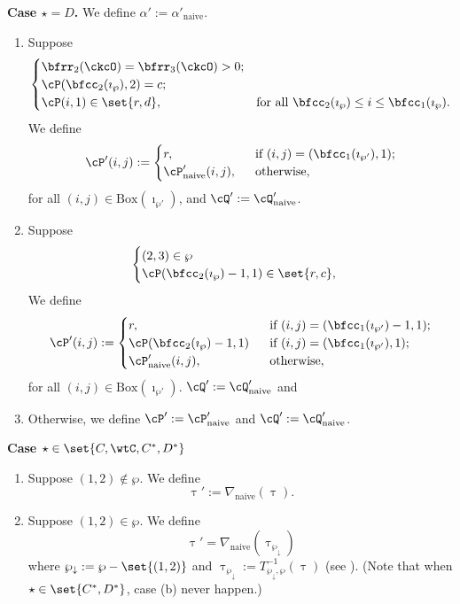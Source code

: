 \documentclass[12pt,a4paper]{amsart}
\numberwithin{equation}{section}
\theoremstyle{remark}
\def\BOX#1{\mathrm{Box}(#1)}
\def\AND{\quad \text{and} \quad}
\def\wpm{\wp_{\downarrow}}
\def\tnaive{\mathrm{naive}}
\def\imathwpp{\imath_{\wp'}}
\def\cPpn{\cP'_\mathrm{naive}}
\def\cQpn{\cQ'_\mathrm{naive}}
\def\alphapn{\alpha'_{\tnaive}}
\def\DDn{\nabla_{\tnaive}}
\begin{document}
{\bfseries Case $\star = D$. }
We define $\alpha' := \alphapn$.
\begin{enumerate}[label=(\alph*)]
  \item  Suppose
  \[
    \begin{cases}
      \bfrr_2(\ckcO)=\bfrr_{3}(\ckcO)>0; & \\
      \cP(\bfcc_{2}(\imath_{\wp}),2) = c;  &\\
      \cP(i,1)\in \set{r,d}, & \text{for all
        $\bfcc_{2}(\imath_{\wp})\leq i\leq \bfcc_{1}(\imath_{\wp})$}.
    \end{cases}
  \]
  We define %
  \[
    \cP'(i,j) := \begin{cases}
      r, & \ \text{ if $(i,j) = (\bfcc_1(\imathwpp),1)$;}\\
      \cPpn(i,j), & \ \text{ otherwise},
    \end{cases}
  \] for all $(i,j)\in \BOX{\imathwpp}$, and
  $\cQ' := \cQpn $.
  \item Suppose
  \[
    \begin{cases}
      (2,3)\in \wp & \\
      \cP(\bfcc_2(\imath_{\wp})-1,1)\in \set{r,c},
    \end{cases}
  \]
  We define
  \[
    \cP'(i,j) := \begin{cases}
      r, & \ \text{ if $(i,j) = (\bfcc_1(\imathwpp)-1,1)$;}\\
      \cP(\bfcc_2(\imath_{\wp})-1,1) & \ \text{ if $(i,j) = (\bfcc_1(\imathwpp),1)$;}\\
      \cPpn(i,j), & \ \text{ otherwise},
    \end{cases}
  \] for all $(i,j)\in \BOX{\imathwpp}$.
  $\cQ' := \cQpn $ and
  \item Otherwise, we define $\cP' := \cPpn$ and $\cQ':= \cQpn$.
\end{enumerate}

{\bfseries Case $\star \in \set{C,\wtC,C^{*},D^{*}}$}

\begin{enumerate}[label=(\alph*)]
  \item Suppose $(1,2)\notin \wp$. We define
  \[
    \uptau' := \DDn(\uptau).
  \]
  \item Suppose $(1,2)\in \wp$. We define
  \[
  \uptau' = \DDn(\uptau_{\wpm})
  \]
  where $\wpm := \wp - \set{(1,2)}$ and
  $\uptau_{\wpm}  := T_{\wpm,\wp}^{-1}(\uptau)$ (see ).
        (Note that when $\star \in \set{C^{*},D^{*}}$, case (b) never happen.)
\end{enumerate}
\end{document}
